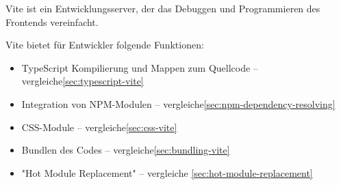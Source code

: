 

Vite ist ein Entwicklungsserver, der das Debuggen und Programmieren des Frontends vereinfacht. \cite{ViteOverview}

Vite bietet für Entwickler folgende Funktionen:

\begin{itemize}
    \item TypeScript Kompilierung und Mappen zum Quellcode -- vergleiche\ref{sec:typescript-vite}
    \item Integration von NPM-Modulen -- vergleiche\ref{sec:npm-dependency-resolving}
    \item CSS-Module -- vergleiche\ref{sec:css-vite}
    \item Bundlen des Codes -- vergleiche\ref{sec:bundling-vite}
    \item "Hot Module Replacement" -- vergleiche \ref{sec:hot-module-replacement}
\end{itemize}



